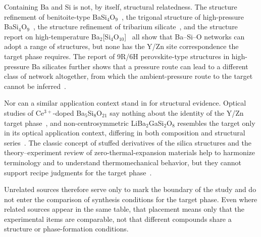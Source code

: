 Containing Ba and Si is not, by itself, structural relatedness. The structure refinement of benitoite-type BaSi$_4$O$_9$~\cite{finger1995refinement}, the trigonal structure of high-pressure BaSi$_4$O$_9$~\cite{hazen1999crystal}, the structure refinement of tribarium silicate~\cite{tillmanns1978refinement}, and the structure report on high-temperature Ba$_2$[Si$_4$O$_{10}$]~\cite{katscher1973the} all show that Ba--Si--O networks can adopt a range of structures, but none has the Y\slash Zn site correspondence the target phase requires. The report of 9R/6H perovskite-type structures in high-pressure Ba silicates further shows that a pressure route can lead to a different class of network altogether, from which the ambient-pressure route to the target cannot be inferred~\cite{yusa2007rhombohedral}.

Nor can a similar application context stand in for structural evidence. Optical studies of Ce$^{3+}$-doped Ba$_5$Si$_8$O$_{21}$ say nothing about the identity of the Y\slash Zn target phase~\cite{zhong2020combining}, and non-centrosymmetric LiBa$_2$GaSi$_2$O$_8$ resembles the target only in its optical application context, differing in both composition and structural series~\cite{gu2025liba2gasi2o8}. The classic concept of stuffed derivatives of the silica structures and the theory--experiment review of zero-thermal-expansion materials help to harmonize terminology and to understand thermomechanical behavior, but they cannot support recipe judgments for the target phase~\cite{buerger1954the,erlebach2020thermomechanical}.

Unrelated sources therefore serve only to mark the boundary of the study and do not enter the comparison of synthesis conditions for the target phase. Even where related sources appear in the same table, that placement means only that the experimental items are comparable, not that different compounds share a structure or phase-formation conditions.
